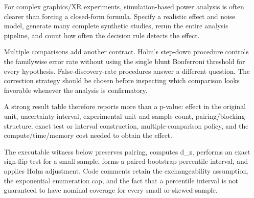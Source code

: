 For complex graphics/XR experiments, simulation-based power analysis is often clearer than forcing a closed-form formula. Specify a realistic effect and noise model, generate many complete synthetic studies, rerun the entire analysis pipeline, and count how often the decision rule detects the effect.

Multiple comparisons add another contract. Holm's step-down procedure controls the familywise error rate without using the single blunt Bonferroni threshold for every hypothesis. False-discovery-rate procedures answer a different question. The correction strategy should be chosen before inspecting which comparison looks favorable whenever the analysis is confirmatory.

A strong result table therefore reports more than a p-value: effect in the original unit, uncertainty interval, experimental unit and sample count, pairing/blocking structure, exact test or interval construction, multiple-comparison policy, and the compute/time/memory cost needed to obtain the effect.

The executable witness below preserves pairing, computes d\_z, performs an exact sign-flip test for a small sample, forms a paired bootstrap percentile interval, and applies Holm adjustment. Code comments retain the exchangeability assumption, the exponential enumeration cap, and the fact that a percentile interval is not guaranteed to have nominal coverage for every small or skewed sample.

